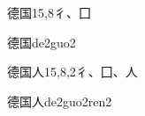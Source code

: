 \begin{entry}{德国}{15,8}{⼻、⼞}
  \begin{phonetics}{德国}{de2guo2}
  \end{phonetics}
\end{entry}

\begin{entry}{德国人}{15,8,2}{⼻、⼞、⼈}
  \begin{phonetics}{德国人}{de2guo2ren2}
  \end{phonetics}
\end{entry}


